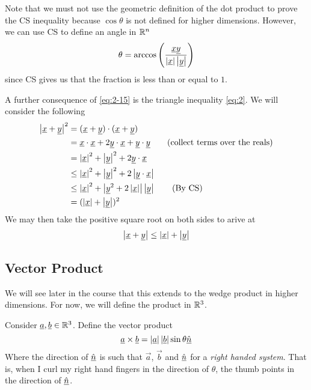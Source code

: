\documentclass{article}
\numberwithin{equation}{section}
\begin{document}
Note that we must not use the geometric definition of the dot product to prove the CS inequality because $\cos{\theta}$ is not defined for higher dimensions. However, we can use CS to define an angle in $\mathbb{R}^n$
\[
    \theta = \arccos{\left(\frac{\underline{x}\underline{y}}{\left\lvert \underline{x}\right\rvert\left\lvert \underline{y}\right\rvert}\right)}    
\]
since CS gives us that the fraction is less than or equal to $1$.


A further consequence of \eqref{eq:2-15} is the triangle inequality \eqref{eq:2}. We will consider the following
\begin{align*}
    \left\lvert \underline{x} + \underline{y}\right\rvert^2 &= (\underline{x} + \underline{y}) \cdot (\underline{x} + \underline{y}) \\
    &= \underline{x} \cdot \underline{x} + 2 \underline{y} \cdot \underline{x} + \underline{y} \cdot \underline{y} \tag{collect terms over the reals} \\
    &= \left\lvert \underline{x}\right\rvert^2 + \left\lvert \underline{y}\right\rvert^2 + 2 \underline{y} \cdot \underline{x} \\
    &\leq \left\lvert \underline{x}\right\rvert^2 + \left\lvert \underline{y}\right\rvert^2 + 2 \left\lvert \underline{y} \cdot \underline{x}\right\rvert \\
    &\leq \left\lvert \underline{x}\right\rvert^2 + \left\lvert \underline{y}^2 + 2\left\lvert \underline{x}\right\rvert\right\rvert\left\lvert \underline{y}\right\rvert \tag{By CS}\\
    &= (\left\lvert \underline{x}\right\rvert + \left\lvert \underline{y}\right\rvert)^2 
\end{align*}
We may then take the positive square root on both sides to arive at
\begin{equation}
    \left\lvert \underline{x} + \underline{y}\right\rvert \leq \left\lvert \underline{x}\right\rvert + \left\lvert \underline{y}\right\rvert
\end{equation}

\subsection{Vector Product}
We will see later in the course that this extends to the wedge product in higher dimensions. For now, we will define the product in $\mathbb{R}^3$.
\begin{defi}
    Consider $\underline{a}, \underline{b} \in \mathbb{R}^3$. Define the vector product
    \[
        \underline{a} \times \underline{b} = \left\lvert \underline{a}\right\rvert\left\lvert \underline{b}\right\rvert\sin{\theta}\hat{\underline{n}}
    \]
    Where the direction of $\hat{\underline{n}}$ is such that $\vec{a}$, $\vec{b}$ and $\hat{\underline{n}}$ for a \emph{right handed system}. That is, when I curl my right hand fingers in the direction of $\theta$, the thumb points in the direction of $\hat{\underline{n}}$.
\end{defi}
\end{document}
